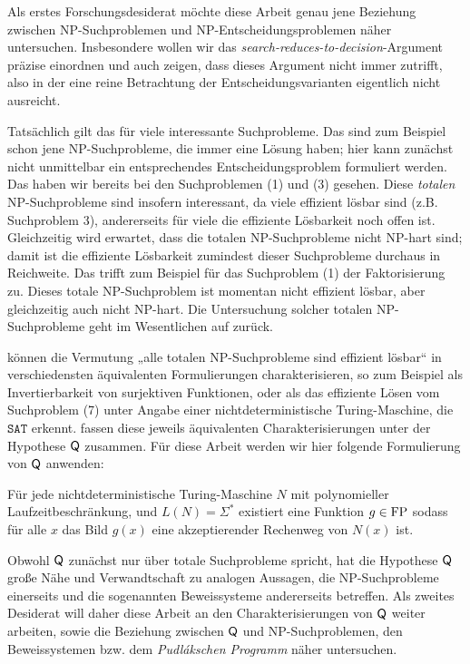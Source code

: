 Als erstes Forschungsdesiderat möchte diese Arbeit genau jene Beziehung zwischen NP-Suchproblemen und NP-Entscheidungsproblemen näher untersuchen. 
Insbesondere wollen wir das \emph{search-reduces-to-decision}-Argument präzise einordnen und auch zeigen, dass dieses Argument nicht immer zutrifft, also in der eine reine Betrachtung der Entscheidungsvarianten eigentlich nicht ausreicht. 

Tatsächlich gilt das für viele interessante Suchprobleme. Das sind zum Beispiel schon jene NP-Suchprobleme, die immer eine Lösung haben; hier kann zunächst nicht unmittelbar ein entsprechendes Entscheidungsproblem formuliert werden.
Das haben wir bereits bei den Suchproblemen (1) und (3) gesehen.
Diese \emph{totalen} NP-Suchprobleme sind insofern interessant, da viele effizient lösbar sind (z.B. Suchproblem 3), andererseits für viele die effiziente Lösbarkeit noch offen ist. Gleichzeitig wird erwartet, dass die totalen NP-Suchprobleme nicht NP-hart sind; damit ist die effiziente Lösbarkeit zumindest dieser Suchprobleme durchaus in Reichweite. 
Das trifft zum Beispiel für das Suchproblem (1) der Faktorisierung zu. Dieses totale NP-Suchproblem ist momentan nicht effizient lösbar, aber gleichzeitig auch nicht NP-hart. Die Untersuchung solcher totalen NP-Suchprobleme geht im Wesentlichen auf \textcites{johnson_how_1988}{megiddo_total_1991} zurück.

\textcite{fenner_inverting_2003} können die Vermutung „alle totalen NP-Suchprobleme sind effizient lösbar“ in verschiedensten äquivalenten Formulierungen charakterisieren, so zum Beispiel als Invertierbarkeit von surjektiven Funktionen, oder als das effiziente Lösen vom Suchproblem (7) unter Angabe einer nichtdeterministische Turing-Maschine, die $\mathtt{SAT}$ erkennt.
\citeauthor{fenner_inverting_2003} fassen diese jeweils äquivalenten Charakterisierungen unter der Hypothese $\mathsf{Q}$ zusammen. Für diese Arbeit werden wir hier folgende Formulierung von  $\mathsf{Q}$ anwenden:
\begin{conjecture}\label{conj:q}
    Für jede nichtdeterministische Turing-Maschine $N$ mit polynomieller Laufzeitbeschränkung, und $L(N)=\Sigma^*$ existiert eine Funktion $g\in\mathrm{FP}$ sodass für alle $x$ das Bild $g(x)$ eine akzeptierender Rechenweg von $N(x)$ ist. 
\end{conjecture}
Obwohl $\mathsf{Q}$ zunächst nur über totale Suchprobleme spricht, hat die Hypothese 
 $\mathsf{Q}$ große Nähe und Verwandtschaft zu analogen Aussagen, die NP-Suchprobleme einerseits und die sogenannten Beweissysteme andererseits betreffen.
Als zweites Desiderat will daher diese Arbeit an den Charakterisierungen von $\mathsf{Q}$ weiter arbeiten, sowie die Beziehung zwischen $\mathsf{Q}$ und NP-Suchproblemen, den Beweissystemen \parencite[nach][]{cook_relative_1979} bzw. dem \emph{Pudlákschen Programm} \parencite*{pudlak_incompleteness_2017} näher untersuchen.


